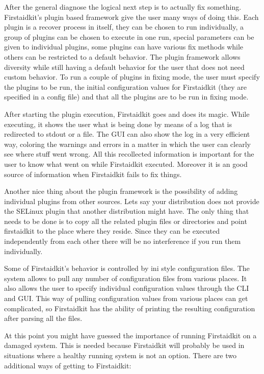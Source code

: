\documentclass[a4paper,13pt]{article}
\begin{document}
After the general diagnose the logical next step is to actually fix something.  Firstaidkit's plugin based framework give the user many ways of doing this.  Each plugin is a recover process in itself, they can be chosen to run individually, a group of plugins can be chosen to execute in one run, special parameters can be given to individual plugins, some plugins can have various fix methods while others can be restricted to a default behavior.  The plugin framework allows diversity while still having a default behavior for the user that does not need custom behavior.  To run a couple of plugins in fixing mode, the user must specify the plugins to be run, the initial configuration values for Firstaidkit (they are specified in a config file) and that all the plugins are to be run in fixing mode.

After starting the plugin execution, Firstaidkit goes and does its magic.  While executing, it shows the user what is being done by means of a log that is redirected to stdout or a file.  The GUI can also show the log in a very efficient way, coloring the warnings and errors in a matter in which the user can clearly see where stuff went wrong.  All this recollected information is important for the user to know what went on while Firstaidkit executed.  Moreover it is an good source of information when Firstaidkit fails to fix things.

Another nice thing about the plugin framework is the possibility of adding individual plugins from other sources.  Lets say your distribution does not provide the SELinux plugin that another distribution might have.  The only thing that needs to be done is to copy all the related plugin files or directories and point firstaidkit to the place where they reside.  Since they can be executed independently from each other there will be no interference if you run them individually.

Some of Firstaidkit's behavior is controlled by ini style configuration files.  The system allows to pull any number of configuration files from various places.  It also allows the user to specify individual configuration values through the CLI and GUI.  This way of pulling configuration values from various places can get complicated, so Firstaidkit has the ability of printing the resulting configuration after parsing all the files.

At this point you might have guessed the importance of running Firstaidkit on a damaged system.  This is needed because Firstaidkit will probably be used in situations where a healthy running system is not an option.  There are two additional ways of getting to Firstaidkit:
\end{document}
